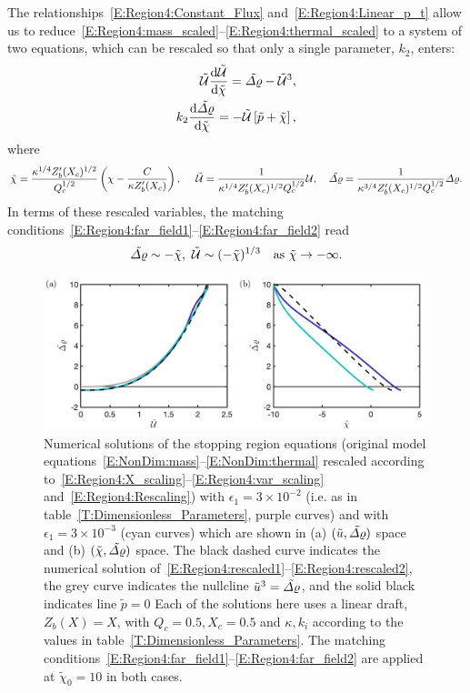 \documentclass[openacc]{rsproca_new}%
\newcommand{\dd}[2]{\frac{\mathrm{d} #1}{\mathrm{d} #2}}
\newcommand{\epsone}{\epsilon_{1}} %
\begin{document}
The relationships~\eqref{E:Region4:Constant_Flux} and~\eqref{E:Region4:Linear_p_t} allow us to reduce~\eqref{E:Region4:mass_scaled}--\eqref{E:Region4:thermal_scaled} to a system of two equations, which can be rescaled so that only a single parameter, $k_2$, enters:
\begin{align}
\tilde{\U} \dd{\tilde{\U}}{\tilde{\chi}} = \tilde{\p} - \tilde{\U}^3,\label{E:Region4:rescaled1}\\
k_2  \dd{\tilde{\p}}{\tilde{\chi}} = -\tilde{\U}\left[\tilde{p} + \tilde{\chi}\right],\label{E:Region4:rescaled2}
\end{align}
where
\begin{equation}\label{E:Region4:Rescaling}
\tilde{\chi} = \frac{\kappa^{1/4}Z_b'(X_c)^{1/2}}{Q_c^{1/2}}\left(\chi - \frac{C}{\kappa Z_b'(X_c)}\right), ~\quad  \tilde{\mathcal{U}} = \frac{1}{\kappa^{1/4}Z_b'(X_c)^{1/2}Q_c^{1/2}}\mathcal{U},\quad \tilde{\varDelta \varrho}= \frac{1}{\kappa^{3/4}Z_b'(X_c)^{ 1/2}Q_c^{1/2}}\varDelta \varrho.
\end{equation} 
In terms of these rescaled variables, the matching conditions~\eqref{E:Region4:far_field1}--\eqref{E:Region4:far_field2} read
\begin{equation}\label{E:Region4:Rescaled_farfield}
\tilde{\varDelta \varrho} \sim -\tilde{\chi},~ \tilde{\mathcal{U}}\sim (-\tilde{\chi})^{1/3}\quad \text{as}~\tilde{\chi}\to -\infty.
\end{equation}


\begin{figure}
\centering
\includegraphics[width = 0.99\textwidth]{Submitted_PRSA/make_plots/plots/figure5.png}
\caption{Numerical solutions of the stopping region equations (original model equations~\eqref{E:NonDim:mass}--\eqref{E:NonDim:thermal} rescaled according to~\eqref{E:Region4:X_scaling}--\eqref{E:Region4:var_scaling} and~\eqref{E:Region4:Rescaling}) with $\epsone = 3\times 10^{-2}$ (i.e. as in table~\ref{T:Dimensionless_Parameters}, purple curves) and with $\epsone = 3\times 10^{-3}$ (cyan curves) which are shown in (a) $(\tilde{u}, \tilde{\varDelta \varrho})$ space and (b) $(\tilde{\chi}, \tilde{\varDelta \varrho})$ space. The black dashed curve indicates the numerical solution of~\eqref{E:Region4:rescaled1}--\eqref{E:Region4:rescaled2}, the grey curve indicates the nullcline $\tilde{u}^3 = \tilde{\varDelta \varrho}$, and the solid black indicates line $\tilde{p} = 0$ Each of the solutions here uses a linear draft, $Z_b(X) = X$, with $Q_c = 0.5, X_c = 0.5$ and $\kappa, k_i$ according to the values in table~\ref{T:Dimensionless_Parameters}. The matching conditions~\eqref{E:Region4:far_field1}--\eqref{E:Region4:far_field2} are applied at $\tilde{\chi}_0 = 10$ in both cases. }\label{fig:Region4}
\end{figure}
\end{document}
